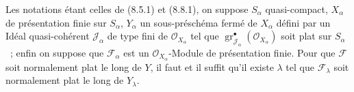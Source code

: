 \begin{proposition}[11.3.6]
\label{IV.11.3.6-fr}
Les notations étant celles de \textup{(8.5.1)} et \textup{(8.8.1)}, on suppose $S_\alpha$
quasi-compact, $X_\alpha$ de présentation finie sur $S_\alpha$, $Y_\alpha$ un
sous-préschéma fermé de $X_\alpha$ défini par un Idéal quasi-cohérent
$\mathcal J_\alpha$ de type fini de $\mathcal O_{X_\alpha}$ tel que
$\operatorname{gr}_{\mathcal J_\alpha}^\bullet(\mathcal O_{X_\alpha})$ soit plat sur
$S_\alpha$~; enfin on suppose que $\mathcal F_\alpha$ est un
$\mathcal O_{X_\alpha}$-Module de présentation finie. Pour que $\mathcal F$
soit normalement plat le long de $Y$, il faut et il suffit qu'il existe
$\lambda$ tel que $\mathcal F_\lambda$ soit normalement plat le long de
$Y_\lambda$.
\end{proposition}

